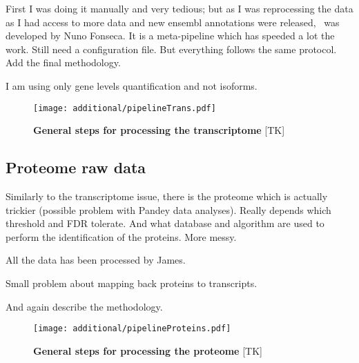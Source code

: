 First I  was doing it manually and very tedious; but as I was reprocessing the data
as I had access to more data and new ensembl annotations were released, \irap\
was developed by Nuno Fonseca. It is a meta-pipeline which has speeded a lot the
work. Still need a configuration file. But everything follows the same protocol.
Add the final methodology.

I am using only gene levels quantification and not isoforms.

\begin{figure}
    \texttt{[image: additional/pipelineTrans.pdf]}\centering
    \caption[General steps for processing the transcriptomic
    data]{\label{fig:pipelineTrans}\textbf{General steps for processing the
    transcriptome} [TK]}
  \end{figure}


\subsection{Proteome raw data}

Similarly to the transcriptome issue, there is the proteome which is actually
trickier (possible problem with Pandey data analyses). Really depends which
threshold and \gls{FDR} tolerate. And what database and algorithm are used to perform
the identification of the proteins. More messy.

All the data has been processed by James.

Small problem about mapping back proteins to transcripts.



And again describe the methodology.

  \begin{figure}
      \texttt{[image: additional/pipelineProteins.pdf]}\centering
      \caption[General steps for processing the proteome
      data]{\label{fig:pipelineProt}\textbf{General steps for processing the
      proteome} [TK] }
  \end{figure}

